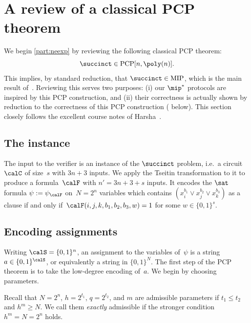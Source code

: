\section{A review of a classical PCP theorem}\label{sec:classical-pcp}

We begin \cref{part:neexp} by reviewing the following classical PCP theorem:
\begin{equation}
\succinct \in \mathrm{PCP}[n, \poly(n)].
\end{equation}
This implies, by standard reduction, that $\succinct \in \mathrm{MIP}$,
which is the main result of~\cite{BFL91}.
Reviewing this serves two purposes:
(i) our $\mip^*$ protocols are inspired by this PCP construction,
and (ii) their correctness is actually shown by reduction to the correctness of this PCP construction ( below).
This section closely follows the excellent course notes of Harsha~\cite{Har10}.

\subsection{The instance}

The input to the verifier is an instance of the $\succinct$ problem,
i.e.\ a circuit~$\calC$  of size~$s$ with $3n+3$ inputs.
We apply the Tseitin transformation to it to produce a formula~$\calF$ with $n' = 3n+3+s$ inputs.
It encodes the $\sat$ formula $\psi := \psi_{\calF}$ on~$N = 2^n$ variables
which contains $(x_i^{b_1} \lor x_j^{b_2} \lor x_k^{b_3})$ 
as a clause
if and only if~$\calF(i, j, k, b_1, b_2, b_3, w) = 1$ for some $w \in \{0, 1\}^s$.

\subsection{Encoding assignments}

Writing $\calS = \{0, 1\}^n$, an assignment to the variables of~$\psi$ is a string $a \in \{0,1\}^{\calS}$, or equivalently a string in $\{0, 1\}^N$.
The first step of the PCP theorem is to take the low-degree encoding of~$a$.
We begin by choosing parameters.

\begin{definition}\label{def:admissible}
Recall that
$N = 2^n$,
$h= 2^{t_1}$,
$q = 2^{t_2}$,
and $m$ are admissible parameters if $t_1 \leq t_2$ and $h^m \geq N$.
We call them \emph{exactly} admissible if the stronger condition $h^m = N = 2^n$ holds.
\end{definition}

